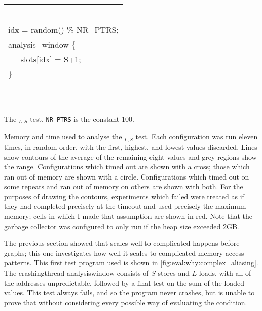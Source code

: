 \begin{sanefig}
{{{\begin{tabular}{ll}
        \\
        \\
        \\
        \\
        \\
        \\
        \\
        \multicolumn{2}{l}{idx = random() \% NR\_PTRS;}\\
        \multicolumn{2}{l}{analysis\_window \{} \\
        & slots[idx] = S+1; \\
        \multicolumn{2}{l}{\}}\\
        \\
        \\
        \\
        \\
        \\
        \\
        \\
        \\
      \end{tabular}
    }
  }
  }
  {\hfill}
  \caption{The $_{L,S}$ test.
    \texttt{NR\_PTRS} is the constant 100.}
  \label{fig:eval:why:complex_aliasing}
\end{sanefig}

\begin{sanefig}
  \caption{Memory and time used to analyse the
    $_{L,S}$ test.  Each configuration was run
    eleven times, in random order, with the first, highest, and lowest
    values discarded.  Lines show contours of the average of the
    remaining eight values and grey regions show the range.
    Configurations which timed out are shown with a cross; those which
    ran out of memory are shown with a circle.  Configurations which
    timed out on some repeats and ran out of memory on others are
    shown with both.  For the purposes of drawing the contours,
    experiments which failed were treated as if they had completed
    precisely at the timeout and used precisely the maximum memory;
    cells in which I made that assumption are shown in red.  Note that
    the {\implementation} garbage collector was configured to only run
    if the heap size exceeded 2GB.}
  \label{fig:eval:why:complex_aliasing:result1}
\end{sanefig}

\noindent
The previous section showed that {\technique} scales well to
complicated happens-before graphs; this one investigates how well it
scales to complicated memory access patterns.  This first test program
used is shown in \autoref{fig:eval:why:complex_aliasing}.  The
\gls{crashingthread} \gls{analysiswindow} consists of $S$ stores and
$L$ loads, with all of the addresses unpredictable, followed by a
final test on the sum of the loaded values.  This test always fails,
and so the program never crashes, but {\technique} is unable to prove
that without considering every possible way of evaluating the
condition.

